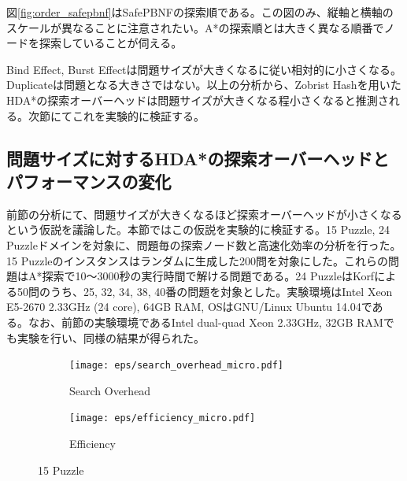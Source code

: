 \documentclass[uplatex]{jsarticle}
\begin{document}
図\ref{fig:order_safepbnf}はSafePBNFの探索順である。この図のみ、縦軸と横軸のスケールが異なることに注意されたい。A*の探索順とは大きく異なる順番でノードを探索していることが伺える。
\newline

Bind Effect, Burst Effectは問題サイズが大きくなるに従い相対的に小さくなる。Duplicateは問題となる大きさではない。以上の分析から、Zobrist Hashを用いたHDA*の探索オーバーヘッドは問題サイズが大きくなる程小さくなると推測される。次節にてこれを実験的に検証する。


\subsection{問題サイズに対するHDA*の探索オーバーヘッドとパフォーマンスの変化}
\label{sec:speedup_size}
前節の分析にて、問題サイズが大きくなるほど探索オーバーヘッドが小さくなるという仮説を議論した。本節ではこの仮説を実験的に検証する。15 Puzzle, 24 Puzzleドメインを対象に、問題毎の探索ノード数と高速化効率の分析を行った。15 Puzzleのインスタンスはランダムに生成した200問を対象にした。これらの問題はA*探索で10～3000秒の実行時間で解ける問題である。24 PuzzleはKorfによる50問のうち、25, 32, 34, 38, 40番の問題を対象とした\cite{Korf2002}。実験環境はIntel Xeon E5-2670 2.33GHz (24 core), 64GB RAM, OSはGNU/Linux Ubuntu 14.04である。なお、前節の実験環境であるIntel dual-quad Xeon 2.33GHz, 32GB RAMでも実験を行い、同様の結果が得られた。

\begin{figure}
	\centering
	\begin{subfigure}{0.45\columnwidth}
		\texttt{[image: eps/search\_overhead\_micro.pdf]}	
		\caption{Search Overhead}
		\label{fig:david_so}
	\end{subfigure}
	\begin{subfigure}{0.45\columnwidth}
		\texttt{[image: eps/efficiency\_micro.pdf]}	
		\caption{Efficiency}
		\label{fig:david_speedup}
	\end{subfigure}
	\caption{15 Puzzle}
	\label{fig:15_david}
\end{figure}
\end{document}
